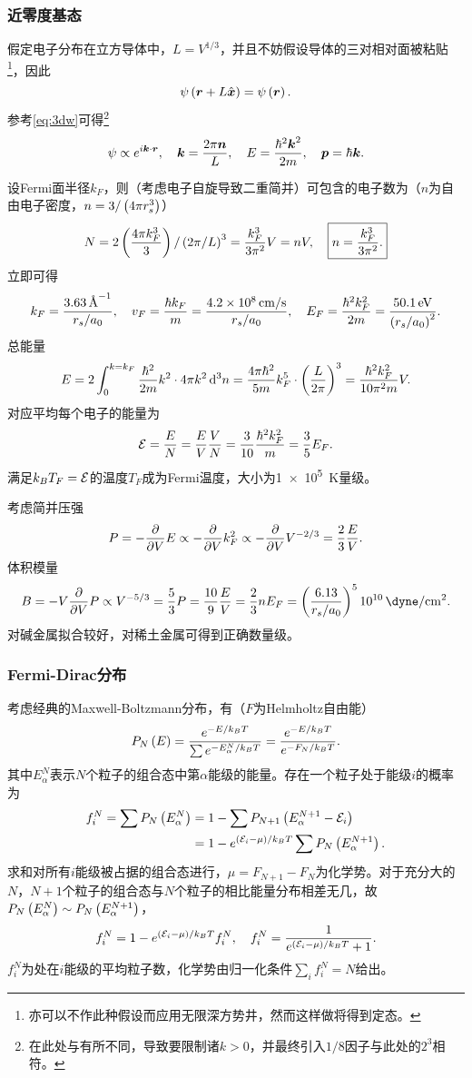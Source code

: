 \documentclass{ctexart}
\begin{document}
\subsubsection{近零度基态}
假定电子分布在立方导体中，$L=V^{1/3}$，并且不妨假设导体的三对相对面被粘贴\footnote{亦可以不作此种假设而应用无限深方势井\cite{iqm}，然而这样做将得到定态。}，因此
\[ \psi\left(\boldsymbol{r} + L\hat{\boldsymbol{x}}\right) = \psi\left(\boldsymbol{r}\right). \]
参考\eqref{eq:3dw}可得\footnote{\cite{iqm}在此处与\cite{ssph}有所不同，导致\cite{iqm}要限制诸$k>0$，并最终引入$1/8$因子与此处的$2^3$相符。}
\[ \psi \propto e^{i\boldsymbol{k}\cdot\boldsymbol{r}}, \quad \boldsymbol{k} = \frac{2\pi\boldsymbol{n}}{L}, \quad E = \frac{\hbar^2\boldsymbol{k}^2}{2m}, \quad \boldsymbol{p}=\hbar\boldsymbol{k}.  \]
\par
设Fermi面半径$k_F$，则（考虑电子自旋导致二重简并）可包含的电子数为（$n$为自由电子密度，$n=3/\left(4\pi r_s^3\right)$）
\begin{equation}
\label{eq:fmn}
N = 2\left(\frac{4\pi k_F^3}{3}\right)/\left(2\pi/L\right)^3 = \frac{k_F^3}{3\pi^2}V = nV, \quad \boxed{n = \frac{k_F^3}{3\pi^2}.}
\end{equation}
立即可得
\[ k_F = \frac{\SI{3.63}{\per\angstrom}}{r_s/a_0}, \quad v_F = \frac{\hbar k_F}{m} = \frac{\SI{4.2e8}{cm/s}}{r_s/a_0}, \quad E_F = \frac{\hbar^2 k_F^2}{2m} = \frac{\SI{50.1}{eV}}{\left(r_s/a_0\right)^2}. \]
总能量
\[ E = 2 \int_0^{k=k_F} \frac{\hbar^2}{2m}k^2\cdot 4\pi k^2 \,\mathrm{d} ^3n = \frac{4\pi\hbar^2}{5m}k_F^5\cdot \left(\frac{L}{2\pi}\right)^3 = \frac{\hbar^2 k_F^2}{10\pi^2 m}V. \]
对应平均每个电子的能量为
\[ \mathcal{E} = \frac{E}{N} = \frac{E}{V}\frac{V}{N} = \frac{3}{10}\frac{\hbar^2 k_F^2}{m} = \frac{3}{5}E_F. \]
满足$k_BT_F=\mathcal{E}$的温度$T_F$成为Fermi温度，大小为\SI{1e5}{K}量级。
\par
考虑简并压强
\[ P=-\frac{\partial}{\partial V} E \propto -\frac{\partial}{\partial V} k_F^2 \propto -\frac{\partial}{\partial V} V^{-2/3} = \frac{2}{3}\frac{E}{V}.  \]
体积模量
\[ B = -V\ddV P \propto V^{-5/3} = \frac{5}{3}P = \frac{10}{9}\frac{E}{V} = \frac{2}{3}nE_F = \pare{\frac{6.13}{r_s/a_0}}^5\SI[per-mode=fraction]{e10}{\dyne\per\square\cm}. \]
对碱金属拟合较好，对稀土金属可得到正确数量级。
\subsubsection{Fermi-Dirac分布}
考虑经典的Maxwell-Boltzmann分布，有（$F$为Helmholtz自由能）
\[ P_N\left(E\right) = \frac{e^{-E/k_BT}}{\sum e^{-E_\alpha^N/k_BT}} = \frac{e^{-E/k_BT}}{e^{-F_N/k_BT}}. \]
其中$E_\alpha^N$表示$N$个粒子的组合态中第$\alpha$能级的能量。存在一个粒子处于能级$i$的概率为
\begin{align*}f_i^N = \sum P_N\left(E_\alpha^N\right) &= 1 - \sum P_{N+1}\left(E_\alpha^{N+1} - \mathcal{E}_i\right)\\ 
&= 1-e^{\left(\mathcal{E}_i-\mu\right)/k_BT} \sum P_N\left(E_\alpha^{N+1}\right).
\end{align*}
求和对所有$i$能级被占据的组合态进行，$\mu = F_{N+1}-F_N$为化学势。对于充分大的$N$，$N+1$个粒子的组合态与$N$个粒子的相比能量分布相差无几，故$P_N\left(E_\alpha^{N}\right)\sim P_N\left(E_\alpha^{N+1}\right)$，
\[ f_i^N = 1 - e^{\left(\mathcal{E}_i-\mu\right)/k_BT} f_i^N, \quad f_i^N = \frac{1}{e^{\left(\mathcal{E}_i - \mu\right)/k_BT} + 1}.\]
$f_i^N$为处在$i$能级的平均粒子数，化学势由归一化条件$\sum_i f_i^N = N$给出。
\end{document}
